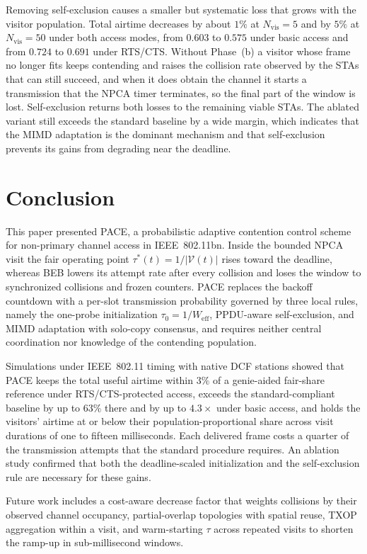\documentclass[a4paper,fleqn]{cas-dc}
\newcommand{\Nvis}{N_\mathrm{vis}}
\begin{document}
Removing self-exclusion causes a smaller but systematic loss that
grows with the visitor population. Total airtime decreases by about
$1\%$ at $\Nvis=5$ and by $5\%$ at $\Nvis=50$ under both access
modes, from $0.603$ to $0.575$ under basic access and from $0.724$ to
$0.691$ under RTS/CTS. Without Phase~(b) a visitor whose frame no
longer fits keeps contending and raises the collision rate observed by
the STAs that can still succeed, and when it does obtain the channel
it starts a transmission that the NPCA timer terminates, so the final
part of the window is lost. Self-exclusion returns both losses to the
remaining viable STAs. The ablated variant still exceeds the standard
baseline by a wide margin, which indicates that the MIMD adaptation is
the dominant mechanism and that self-exclusion prevents its gains from
degrading near the deadline.

\section{Conclusion}
\label{sec:conclusion}

This paper presented PACE, a probabilistic adaptive contention control
scheme for non-primary channel access in IEEE~802.11bn. Inside the
bounded NPCA visit the fair operating point
$\tau^*(t)=1/|\mathcal{V}(t)|$ rises toward the deadline, whereas BEB
lowers its attempt rate after every collision and loses the window to
synchronized collisions and frozen counters. PACE replaces the backoff
countdown with a per-slot transmission probability governed by three
local rules, namely the one-probe initialization
$\tau_0=1/W_\mathrm{eff}$, PPDU-aware self-exclusion, and MIMD
adaptation with solo-copy consensus, and requires neither central
coordination nor knowledge of the contending population.

Simulations under IEEE~802.11 timing with native DCF stations showed
that PACE keeps the total useful airtime within $3\%$ of a genie-aided
fair-share reference under RTS/CTS-protected access, exceeds the
standard-compliant baseline by up to $63\%$ there and by up to
$4.3\times$ under basic access, and holds the visitors' airtime at or
below their population-proportional share across visit durations of
one to fifteen milliseconds. Each delivered frame costs a quarter of
the transmission attempts that the standard procedure requires. An
ablation study confirmed that both the deadline-scaled initialization
and the self-exclusion rule are necessary for these gains.

Future work includes a cost-aware decrease factor that weights
collisions by their observed channel occupancy, partial-overlap
topologies with spatial reuse, TXOP aggregation within a visit, and
warm-starting $\tau$ across repeated visits to shorten the ramp-up in
sub-millisecond windows.
\end{document}
